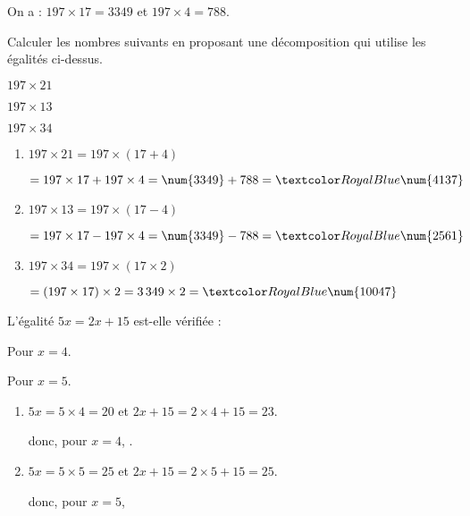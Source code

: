 \begin{Maquette}[Fiche,CorrigeFin,Colonnes=2]{}
\begin{multicols}{2}
      
      \begin{exercice} %
         On a : $197\times17 =\num{3349}$ et $197\times4 =788$. \par
         Calculer les nombres suivants en proposant une décomposition qui utilise les égalités ci-dessus.
         \begin{colenumerate}
            \item $197\times21$
            \item $197\times13$
            \item $197\times34$
         \end{colenumerate}
      \end{exercice}
      
      \begin{Solution}
         \begin{enumerate}
            \item $197\times21 =197\times(17+4) $\par
               $=197\times17+197\times4 =\num{3349}+788 =\cor{\num{4137}}$
            \item $197\times13 =197\times(17-4)$ \par
               $=197\times17-197\times4 =\num{3349}-788 =\cor{\num{2561}}$
            \item $197\times34 =197\times(17\times2)$ \par
               $=(197\times17)\times2 =3\,349\times2 =\cor{\num{10047}}$
         \end{enumerate}
      \end{Solution}
      
      
      \begin{exercice} %
         L'égalité $5x =2x+15$ est-elle vérifiée :
         \begin{colenumerate}
            \item Pour $x =4$.
            \item Pour $x =5$.
         \end{colenumerate}
      \end{exercice}
      
      \begin{Solution}
         \begin{enumerate}
            \item $5x =5\times4 =20$ et $2x+15 =2\times4+15 =23$. \par
               donc, pour $x =4$, .
            \item $5x =5\times5 =25$ et $2x+15=2\times5+15 =25$. \par
               donc, pour $x =5$, 
         \end{enumerate}
      \end{Solution}
      

\end{multicols}
\end{Maquette}
